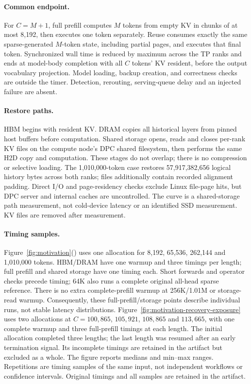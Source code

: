 \documentclass[sigplan,10pt,anonymous,nonacm]{acmart}
\begin{document}
\paragraph{Common endpoint.}
For $C=M+1$, full prefill computes $M$ tokens from empty KV in chunks of
at most 8,192, then executes one token separately. Reuse consumes exactly
the same sparse-generated $M$-token state, including partial pages, and
executes that final token. Synchronized wall time is reduced by maximum
across the TP ranks and ends at model-body completion with all $C$ tokens'
KV resident, before the output vocabulary projection. Model loading,
backup creation, and correctness checks are outside the timer. Detection,
rerouting, serving-queue delay and an injected failure are absent.

\paragraph{Restore paths.}
HBM begins with resident KV. DRAM copies all historical layers from
pinned host buffers before computation. Shared storage opens, reads and
closes per-rank KV files on the compute node's DPC shared filesystem,
then performs the same H2D copy and computation. These stages do not
overlap; there is no compression or selective loading. The 1,010,000-token
case restores 57,917,382,656 logical history bytes across both ranks;
files additionally contain recorded alignment padding. Direct I/O and
page-residency checks exclude Linux file-page hits, but DPC server and
internal caches are uncontrolled. The curve is a shared-storage path
measurement, not cold-device latency or an identified SSD measurement.
KV files are removed after measurement.

\paragraph{Timing samples.}
Figure~\ref{fig:motivation}() uses one
allocation for 8,192, 65,536, 262,144 and 1,010,000 tokens. HBM/DRAM have
one warmup and three timings per length; full prefill and shared storage
have one timing each. Short forwards and operator checks precede timing;
64K also runs a complete original all-head sparse reference. There is
no extra complete-prefill warmup at 256K/1.01M or storage-read warmup.
Consequently, these full-prefill/storage points describe individual
runs, not stable latency distributions.
Figure~\ref{fig:motivation-recovery-exposure} uses two allocations at
$C=100{,}865$, $105{,}921$, $108{,}865$ and $113{,}665$, with one complete
warmup and three full-prefill timings at each length. The initial allocation completed three lengths; the last length was
resumed after an early termination signal. Its incomplete timings are
retained in the artifact but excluded as a whole. The figure reports
medians and min--max ranges. Repetitions are timing samples of the same input,
not independent workflows or confidence intervals. Original timings and
all samples are retained in the artifact.
\end{document}
